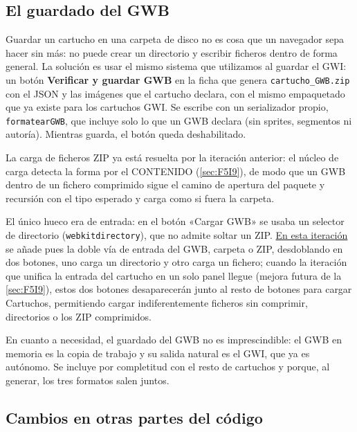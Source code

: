 \subsection{El guardado del GWB}
\label{sec:F5I10Guardado}

Guardar un cartucho en una carpeta de disco no es cosa que un
navegador sepa hacer sin más: no puede crear un directorio y escribir
ficheros dentro de forma general. La solución es usar el mismo sistema 
que utilizamos al guardar el GWI: un botón \textbf{Verificar y guardar GWB}
en la ficha que genera \texttt{cartucho\_GWB.zip} con el JSON y las imágenes 
que el cartucho declara, con el mismo empaquetado que ya existe para los 
cartuchos GWI. Se escribe con un serializador propio, 
\texttt{formatearGWB}, que incluye solo lo que un GWB declara (sin sprites, segmentos ni autoría). Mientras guarda, el botón queda deshabilitado.

La carga de ficheros ZIP ya está resuelta por la iteración anterior: el
núcleo de carga detecta la forma por el CONTENIDO
(\ref{sec:F5I9}), de modo que un GWB dentro de un fichero comprimido
sigue el camino de apertura del paquete y recursión con el tipo esperado y 
carga como si fuera la carpeta. 

El único hueco era de entrada: en el botón «Cargar GWB» se usaba un selector 
de directorio (\texttt{webkitdirectory}), que no admite soltar un ZIP. 
\underline{En esta iteración} se añade pues la doble vía de entrada del 
GWB, carpeta o ZIP, desdoblando en dos botones, uno carga un directorio 
y otro carga un fichero; cuando la iteración que unifica la entrada del 
cartucho en un solo panel llegue (mejora futura de la \ref{sec:F5I9}), 
estos dos botones desaparecerán junto al resto de botones para cargar 
Cartuchos, permitiendo cargar indiferentemente ficheros sin comprimir, 
directorios o los ZIP comprimidos.

En cuanto a necesidad, el guardado del GWB no es imprescindible: el
GWB en memoria es la copia de trabajo y su salida natural es el GWI,
que ya es autónomo. Se incluye por completitud con el resto de
cartuchos y porque, al generar, los tres formatos salen juntos.

\subsection{Cambios en otras partes del código}
\label{sec:F5I10Codigo}

